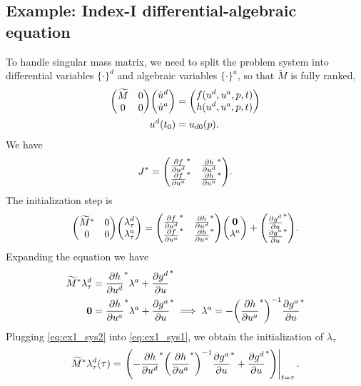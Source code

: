 \documentclass[a4paper,9pt]{article}
\theoremstyle{definition}
\theoremstyle{remark}
\begin{document}
\subsection{Example: Index-I differential-algebraic equation}
To handle singular mass matrix, we need to split the problem system into
differential variables $\{\cdot\}^d$ and algebraic
variables $\{\cdot\}^a$, so that $\widetilde{M}$ is fully ranked,
\begin{align}
  \mqty(\widetilde{M} & 0 \\ 0 & 0) \mqty(\dot{u}^d\\ \dot{u}^a) &= \mqty(f(u^d,
  u^a, p, t)
  \\ h(u^d, u^a, p, t)) \\
  u^d(t_0) &= u_{d0}(p).
\end{align}
We have
\begin{equation}
  J^* = \mqty(\pdv{f}{u^d}^* & \pdv{h}{u^d}^* \\ \pdv{f}{u^a}^* &
  \pdv{h}{u^a}^*).
\end{equation}
The initialization step is
\begin{equation}
  \mqty(\widetilde{M}^* & 0 \\ 0 & 0) \mqty(\lambda_\tau^d\\ \lambda_\tau^a) =
  \mqty(\pdv{f}{u^d}^* & \pdv{h}{u^d}^* \\ \pdv{f}{u^a}^* &
  \pdv{h}{u^a}^*) \mqty(\bm{0}\\ \lambda^a) + \mqty(\pdv{g^d}{u}^* \\
  \pdv{g^a}{u}^*).
\end{equation}
Expanding the equation we have
\begin{align}
  \widetilde{M}^* \lambda_\tau^d &= \pdv{h}{u^d}^* \lambda^a + \pdv{g^d}{u}^*
  \label{eq:ex1_sys1} \\
  \bm{0} &= \pdv{h}{u^a}^* \lambda^a + \pdv{g^a}{u}^* \implies
  \lambda^a = -\qty(\pdv{h}{u^a}^*)^{-1}\pdv{g^a}{u}^* \label{eq:ex1_sys2}
\end{align}
Plugging \cref{eq:ex1_sys2} into \cref{eq:ex1_sys1}, we obtain the
initialization of $\lambda_\tau$
\begin{equation}
  \widetilde{M}^* \lambda_\tau^d(\tau) = \eval{\qty(-\pdv{h}{u^d}^*
    \qty(\pdv{h}{u^a}^*)^{-1}\pdv{g^a}{u}^* +
  \pdv{g^d}{u}^*)}_{t=\tau}.
\end{equation}

\nocite{cao2003adjoint}



\end{document}
